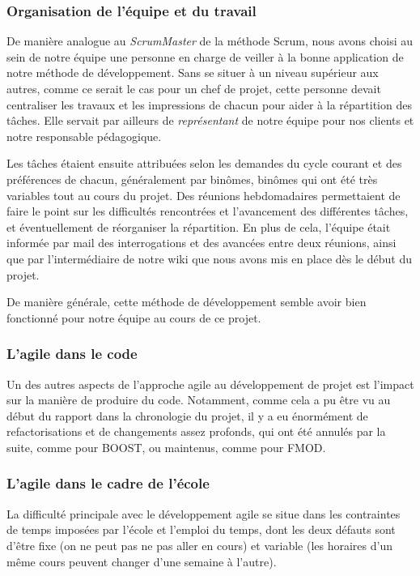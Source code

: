 \subsubsection{Organisation de l'équipe et du travail}

De manière analogue au \textit{ScrumMaster} de la méthode Scrum, nous avons choisi au sein de notre équipe une personne en charge de veiller à la bonne application de notre méthode de développement. Sans se situer à un niveau supérieur aux autres, comme ce serait le cas pour un chef de projet, cette personne devait centraliser les travaux et les impressions de chacun pour aider à la répartition des tâches. Elle servait par ailleurs de \textit{représentant} de notre équipe pour nos clients et notre responsable pédagogique.

Les tâches étaient ensuite attribuées selon les demandes du cycle courant et des préférences de chacun, généralement par binômes, binômes qui ont été très variables tout au cours du projet. Des réunions hebdomadaires permettaient de faire le point sur les difficultés rencontrées et l'avancement des différentes tâches, et éventuellement de réorganiser la répartition. En plus de cela, l'équipe était informée par mail des interrogations et des avancées entre deux réunions, ainsi que par l'intermédiaire de notre wiki que nous avons mis en place dès le début du projet.

De manière générale, cette méthode de développement semble avoir bien fonctionné pour notre équipe au cours de ce projet.

\subsubsection{L'agile dans le code}
Un des autres aspects de l'approche agile au développement de projet est l'impact sur
la manière de produire du code. Notamment, comme cela a pu être vu au début du rapport dans la
chronologie du projet, il y a eu énormément de refactorisations et de changements assez profonds,
qui ont été annulés par la suite, comme pour BOOST, ou maintenus, comme pour FMOD.

\subsubsection{L'agile dans le cadre de l'école}
La difficulté principale avec le développement agile se situe dans les contraintes de temps
imposées par l'école et l'emploi du temps, dont les deux défauts sont d'être fixe (on ne peut pas ne pas aller en cours)
et variable (les horaires d'un même cours peuvent changer d'une semaine à l'autre).


